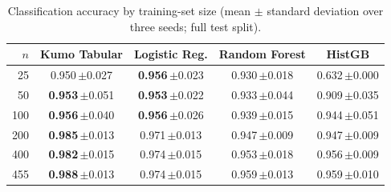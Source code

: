 \begin{table}[t]
\centering
\caption{Classification accuracy by training-set size (mean $\pm$ standard deviation over three seeds; full test split).}
\label{tab:study_classification}
\setlength{\tabcolsep}{3pt}
\begin{tabular}{rcccc}
\toprule
$n$ & Kumo Tabular & Logistic Reg. & Random Forest & HistGB \\
\midrule
25 & 0.950\,{\scriptsize$\pm$0.027} & \textbf{0.956}\,{\scriptsize$\pm$0.023} & 0.930\,{\scriptsize$\pm$0.018} & 0.632\,{\scriptsize$\pm$0.000} \\
50 & \textbf{0.953}\,{\scriptsize$\pm$0.051} & \textbf{0.953}\,{\scriptsize$\pm$0.022} & 0.933\,{\scriptsize$\pm$0.044} & 0.909\,{\scriptsize$\pm$0.035} \\
100 & \textbf{0.956}\,{\scriptsize$\pm$0.040} & \textbf{0.956}\,{\scriptsize$\pm$0.026} & 0.939\,{\scriptsize$\pm$0.015} & 0.944\,{\scriptsize$\pm$0.051} \\
200 & \textbf{0.985}\,{\scriptsize$\pm$0.013} & 0.971\,{\scriptsize$\pm$0.013} & 0.947\,{\scriptsize$\pm$0.009} & 0.947\,{\scriptsize$\pm$0.009} \\
400 & \textbf{0.982}\,{\scriptsize$\pm$0.015} & 0.974\,{\scriptsize$\pm$0.015} & 0.953\,{\scriptsize$\pm$0.018} & 0.956\,{\scriptsize$\pm$0.009} \\
455 & \textbf{0.988}\,{\scriptsize$\pm$0.013} & 0.974\,{\scriptsize$\pm$0.015} & 0.959\,{\scriptsize$\pm$0.013} & 0.959\,{\scriptsize$\pm$0.010} \\
\bottomrule
\end{tabular}
\end{table}
